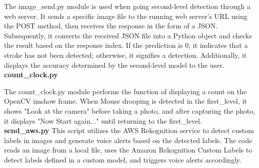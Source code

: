 The image\_send.py module is used when going second-level detection through a web server. It sends a specific image file to the running web server's URL using the POST method, then receives the response in the form of a JSON. Subsequently, it converts the received JSON file into a Python object and checks the result based on the response index. If the prediction is 0, it indicates that a stroke has not been detected; otherwise, it signifies a detection. Additionally, it displays the accuracy determined by the second-level model to the user.\\


\textbf{count\_clock.py}

The count\_clock.py module performs the function of displaying a count on the OpenCV imshow frame. When Mouse drooping is detected in the first\_level, it shows "Look at the camera" before taking a photo, and after capturing the photo, it displays "Now Start again..." until returning to the first\_level.\\


\textbf{send\_aws.py}
This script utilizes the AWS Rekognition service to detect custom labels in images and generate voice alerts based on the detected labels. The code reads an image from a local file, uses the Amazon Rekognition Custom Labels to detect labels defined in a custom model, and triggers voice alerts accordingly.

